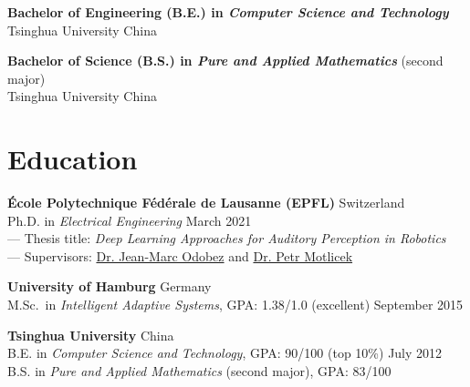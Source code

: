 \documentclass[a4paper,9pt]{extarticle} %
\newcommand{\ind}{\hspace*{1em}}
\begin{document}
\parbox{\textwidth}{%
\textbf{Bachelor of Engineering (B.E.) in \textit{Computer Science and Technology}} \\
\ind{} Tsinghua University \hfill China
}

\parbox{\textwidth}{%
\textbf{Bachelor of Science (B.S.) in \textit{Pure and Applied Mathematics}} (second major) \\
\ind{} Tsinghua University \hfill China
}

\iffalse{}


\section{Education}
\parbox{\textwidth}{%
\textbf{\'Ecole Polytechnique F\'ed\'erale de Lausanne (EPFL)} \hfill Switzerland \\
\ind{} Ph.D. in \textit{Electrical Engineering} \hfill March 2021 \\
\ind{} --- Thesis title: \textit{Deep Learning Approaches for Auditory Perception in Robotics} \\
\ind{} --- Supervisors: \href{https://idiap.ch/~odobez}{Dr. Jean-Marc Odobez} and \href{https://people.idiap.ch/pmotlic}{Dr. Petr Motlicek}
}

\parbox{\textwidth}{%
\textbf{University of Hamburg} \hfill Germany \\
\ind{} M.Sc.\ in \textit{Intelligent Adaptive Systems}, GPA\@: 1.38/1.0 (excellent)  \hfill September 2015%
}

\parbox{\textwidth}{%
\textbf{Tsinghua University} \hfill China \\
\ind{} B.E. in \textit{Computer Science and Technology}, GPA\@: 90/100 (top 10\%) \hfill July 2012 \\
\ind{} B.S. in \textit{Pure and Applied Mathematics} (second major), GPA\@: 83/100 %
}

\end{document}
